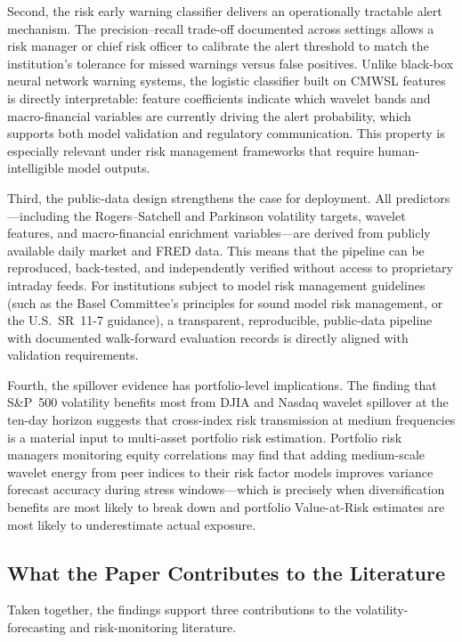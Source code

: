 Second, the risk early warning classifier delivers an operationally tractable alert mechanism. The precision--recall trade-off documented across settings allows a risk manager or chief risk officer to calibrate the alert threshold to match the institution's tolerance for missed warnings versus false positives. Unlike black-box neural network warning systems, the logistic classifier built on CMWSL features is directly interpretable: feature coefficients indicate which wavelet bands and macro-financial variables are currently driving the alert probability, which supports both model validation and regulatory communication. This property is especially relevant under risk management frameworks that require human-intelligible model outputs.

Third, the public-data design strengthens the case for deployment. All predictors---including the Rogers--Satchell and Parkinson volatility targets, wavelet features, and macro-financial enrichment variables---are derived from publicly available daily market and FRED data. This means that the pipeline can be reproduced, back-tested, and independently verified without access to proprietary intraday feeds. For institutions subject to model risk management guidelines (such as the Basel Committee's principles for sound model risk management, or the U.S.\ SR~11-7 guidance), a transparent, reproducible, public-data pipeline with documented walk-forward evaluation records is directly aligned with validation requirements.

Fourth, the spillover evidence has portfolio-level implications. The finding that S\&P~500 volatility benefits most from DJIA and Nasdaq wavelet spillover at the ten-day horizon suggests that cross-index risk transmission at medium frequencies is a material input to multi-asset portfolio risk estimation. Portfolio risk managers monitoring equity correlations may find that adding medium-scale wavelet energy from peer indices to their risk factor models improves variance forecast accuracy during stress windows---which is precisely when diversification benefits are most likely to break down and portfolio Value-at-Risk estimates are most likely to underestimate actual exposure.

\subsection{What the Paper Contributes to the Literature}
\label{subsec:discussion_spillover}

Taken together, the findings support three contributions to the volatility-forecasting and risk-monitoring literature.

